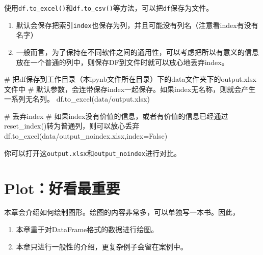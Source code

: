 \documentclass[
  letterpaper,
  DIV=11,
  numbers=noendperiod]{scrreprt}
\newenvironment{Shaded}{\begin{snugshade}}{\end{snugshade}}
\newcommand{\CommentTok}[1]{\textcolor[rgb]{0.37,0.37,0.37}{#1}}
\newcommand{\NormalTok}[1]{\textcolor[rgb]{0.00,0.23,0.31}{#1}}
\newcommand{\OperatorTok}[1]{\textcolor[rgb]{0.37,0.37,0.37}{#1}}
\newcommand{\StringTok}[1]{\textcolor[rgb]{0.13,0.47,0.30}{#1}}
\newcommand{\VariableTok}[1]{\textcolor[rgb]{0.07,0.07,0.07}{#1}}
\providecommand{\tightlist}{%
  \setlength{\itemsep}{0pt}\setlength{\parskip}{0pt}}\usepackage{longtable,booktabs,array}
\begin{document}
使用\texttt{df.to\_excel()}和\texttt{df.to\_csv()}等方法，可以把\texttt{df}保存为文件。

\begin{enumerate}
\def\labelenumi{\arabic{enumi}.}
\tightlist
\item
  默认会保存把索引\texttt{index}也保存为列，并且可能没有列名（注意看index有没有名字）
\item
  一般而言，为了保持在不同软件之间的通用性，可以考虑把所以有意义的信息放在一个普通的列中，则保存DF到文件时就可以放心地丢弃index。
\end{enumerate}

\begin{Shaded}
\begin{Highlighting}[]
\CommentTok{\# 把df保存到工作目录（本ipynb文件所在目录）下的data文件夹下的output.xlsx文件中}
\CommentTok{\# 默认参数，会连带保存index一起保存。如果index无名称，则就会产生一系列无名列。}
\NormalTok{df.to\_excel(}\StringTok{\textquotesingle{}data/output.xlsx\textquotesingle{}}\NormalTok{) }
\end{Highlighting}
\end{Shaded}

\begin{Shaded}
\begin{Highlighting}[]
\CommentTok{\# 丢弃index}
\CommentTok{\# 如果index没有价值的信息，或者有价值的信息已经通过reset\_index()转为普通列，则可以放心丢弃}
\NormalTok{df.to\_excel(}\StringTok{\textquotesingle{}data/output\_noindex.xlsx\textquotesingle{}}\NormalTok{,index}\OperatorTok{=}\VariableTok{False}\NormalTok{) }
\end{Highlighting}
\end{Shaded}

你可以打开这\texttt{output.xlsx}和\texttt{output\_noindex}进行对比。

\hypertarget{plotux597dux770bux6700ux91cdux8981}{%
\chapter{Plot：好看最重要}\label{plotux597dux770bux6700ux91cdux8981}}

本章会介绍如何绘制图形。绘图的内容非常多，可以单独写一本书。因此，

\begin{enumerate}
\def\labelenumi{\arabic{enumi}.}
\tightlist
\item
  本章重于对DataFrame格式的数据进行绘图。
\item
  本章只进行一般性的介绍，更复杂例子会留在案例中。
\end{enumerate}
\end{document}
